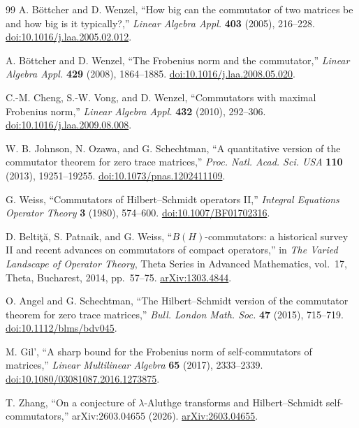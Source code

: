 \documentclass[11pt]{article}
\theoremstyle{definition}
\theoremstyle{remark}
\newcommand{\1}{\mathbf 1}
\begin{document}
\begin{thebibliography}{99}
A. B\"ottcher and D. Wenzel,
``How big can the commutator of two matrices be and how big is it typically?,''
\emph{Linear Algebra Appl.} \textbf{403} (2005), 216--228.
\href{https://doi.org/10.1016/j.laa.2005.02.012}{doi:10.1016/j.laa.2005.02.012}.

A. B\"ottcher and D. Wenzel,
``The Frobenius norm and the commutator,''
\emph{Linear Algebra Appl.} \textbf{429} (2008), 1864--1885.
\href{https://doi.org/10.1016/j.laa.2008.05.020}{doi:10.1016/j.laa.2008.05.020}.

C.-M. Cheng, S.-W. Vong, and D. Wenzel,
``Commutators with maximal Frobenius norm,''
\emph{Linear Algebra Appl.} \textbf{432} (2010), 292--306.
\href{https://doi.org/10.1016/j.laa.2009.08.008}{doi:10.1016/j.laa.2009.08.008}.

W. B. Johnson, N. Ozawa, and G. Schechtman,
``A quantitative version of the commutator theorem for zero trace matrices,''
\emph{Proc. Natl. Acad. Sci. USA} \textbf{110} (2013), 19251--19255.
\href{https://doi.org/10.1073/pnas.1202411109}{doi:10.1073/pnas.1202411109}.

G. Weiss,
``Commutators of Hilbert--Schmidt operators II,''
\emph{Integral Equations Operator Theory} \textbf{3} (1980), 574--600.
\href{https://doi.org/10.1007/BF01702316}{doi:10.1007/BF01702316}.

D. Belti\c{t}\u{a}, S. Patnaik, and G. Weiss,
``$B(H)$-commutators: a historical survey II and recent advances on commutators of compact operators,''
in \emph{The Varied Landscape of Operator Theory}, Theta Series in Advanced Mathematics, vol.~17,
Theta, Bucharest, 2014, pp.~57--75.
\href{https://arxiv.org/abs/1303.4844}{arXiv:1303.4844}.

O. Angel and G. Schechtman,
``The Hilbert--Schmidt version of the commutator theorem for zero trace matrices,''
\emph{Bull. London Math. Soc.} \textbf{47} (2015), 715--719.
\href{https://doi.org/10.1112/blms/bdv045}{doi:10.1112/blms/bdv045}.

M. Gil',
``A sharp bound for the Frobenius norm of self-commutators of matrices,''
\emph{Linear Multilinear Algebra} \textbf{65} (2017), 2333--2339.
\href{https://doi.org/10.1080/03081087.2016.1273875}{doi:10.1080/03081087.2016.1273875}.

T. Zhang,
``On a conjecture of $\lambda$-Aluthge transforms and Hilbert--Schmidt self-commutators,''
arXiv:2603.04655 (2026).
\href{https://arxiv.org/abs/2603.04655}{arXiv:2603.04655}.


\end{thebibliography}
\end{document}

